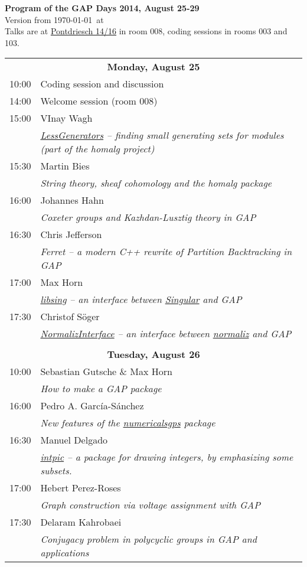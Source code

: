 \documentclass[12pt,a4paper]{article}
\begin{document}
\begin{center}
{\huge\textbf{Program of the GAP Days 2014, August 25-29}\\[2mm]}
Version from \today\ at \currenttime\\[2mm]
Talks are at \href{https://maps.google.com/maps?q=Pontdriesch+14,+Aachen,+Germany&hl=en&ll=50.778617,6.080579&spn=0.004993,0.008969&sll=37.0625,-95.677068&sspn=50.777825,73.476563&oq=pontdriesch+14+&hnear=Pontdriesch+14,+Mitte+52062+Aachen,+Germany&t=m&z=17}{Pontdriesch 14/16}
in room 008, coding sessions in rooms 003 and 103.
\end{center}

\newcommand{\vortrag}[3]{#1 & #2 \\ & \textit{#3} \\}

\newcommand{\newday}[1]{\multicolumn{2}{c}{{\large\textbf{#1}}} \\[1em]}


\begin{tabular}{rp{14.5cm}}
%
\newday{Monday, August 25}
10:00 & Coding session and discussion \\
14:00 & Welcome session (room 008) \\
\vortrag{15:00}{VInay Wagh}{\href{https://github.com/homalg-project/LessGenerators}{LessGenerators} -- finding small generating sets for modules (part of the homalg project)}
\vortrag{15:30}{Martin Bies}{String theory, sheaf cohomology and the homalg package}
\vortrag{16:00}{Johannes Hahn}{Coxeter groups and Kazhdan-Lusztig theory in GAP}
\vortrag{16:30}{Chris Jefferson}{Ferret -- a modern C++ rewrite of Partition Backtracking in GAP}
\vortrag{17:00}{Max Horn}{\href{http://gap-system.github.io/libsing/}{libsing} -- an interface between \href{http://www.singular.uni-kl.de/}{Singular} and GAP}
\vortrag{17:30}{Christof Söger}{\href{https://github.com/fingolfin/NormalizInterface}{NormalizInterface} -- an interface between \href{http://www.math.uos.de/normaliz}{normaliz} and GAP}
%
%
\\
%
%
\newday{Tuesday, August 26}
\vortrag{10:00}{Sebastian Gutsche \& Max Horn}{How to make a GAP package}
\vortrag{16:00}{Pedro A. García-Sánchez
}{New features of the \href{http://www.gap-system.org/Packages/numericalsgps.html}{numericalsgps} package}
\vortrag{16:30}{Manuel Delgado}{\href{http://www.gap-system.org/Packages/intpic.html}{intpic} -- a package for drawing integers, by emphasizing some subsets.}
\vortrag{17:00}{Hebert Perez-Roses}{Graph construction via voltage assignment with GAP}
\vortrag{17:30}{Delaram Kahrobaei}{Conjugacy problem in polycyclic groups in GAP and applications}
%
%
\end{tabular}
\end{document}
